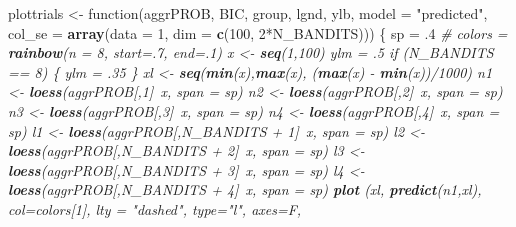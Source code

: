 \documentclass[11pt,,]{article}
\newenvironment{Shaded}{\begin{snugshade}}{\end{snugshade}}
\newcommand{\KeywordTok}[1]{\textcolor[rgb]{0.13,0.29,0.53}{\textbf{{#1}}}}
\newcommand{\DataTypeTok}[1]{\textcolor[rgb]{0.13,0.29,0.53}{{#1}}}
\newcommand{\DecValTok}[1]{\textcolor[rgb]{0.00,0.00,0.81}{{#1}}}
\newcommand{\StringTok}[1]{\textcolor[rgb]{0.31,0.60,0.02}{{#1}}}
\newcommand{\CommentTok}[1]{\textcolor[rgb]{0.56,0.35,0.01}{\textit{{#1}}}}
\newcommand{\NormalTok}[1]{{#1}}
\begin{document}
\begin{Shaded}
\begin{Highlighting}[]
{\NormalTok{plottrials <-}\StringTok{ }\NormalTok{function(aggrPROB, BIC, group, lgnd, ylb, }\DataTypeTok{model =} \StringTok{"predicted"}\NormalTok{, }
                       \DataTypeTok{col_se =} \KeywordTok{array}\NormalTok{(}\DataTypeTok{data =} \DecValTok{1}\NormalTok{, }\DataTypeTok{dim =} \KeywordTok{c}\NormalTok{(}\DecValTok{100}\NormalTok{, }\DecValTok{2}\NormalTok{*N_BANDITS))) \{}
    \NormalTok{sp =}\StringTok{ }\NormalTok{.}\DecValTok{4} \CommentTok{# % of the points}
    \NormalTok{colors =}\StringTok{ }\KeywordTok{rainbow}\NormalTok{(}\DataTypeTok{n =} \DecValTok{8}\NormalTok{, }\DataTypeTok{start=}\NormalTok{.}\DecValTok{7}\NormalTok{, }\DataTypeTok{end=}\NormalTok{.}\DecValTok{1}\NormalTok{)}
    \NormalTok{x <-}\StringTok{ }\KeywordTok{seq}\NormalTok{(}\DecValTok{1}\NormalTok{,}\DecValTok{100}\NormalTok{)}
    \NormalTok{ylm =}\StringTok{ }\NormalTok{.}\DecValTok{5}
    \NormalTok{if (N_BANDITS ==}\StringTok{ }\DecValTok{8}\NormalTok{) \{}
        \NormalTok{ylm =}\StringTok{ }\NormalTok{.}\DecValTok{35}
    \NormalTok{\}}
    \NormalTok{xl <-}\StringTok{ }\KeywordTok{seq}\NormalTok{(}\KeywordTok{min}\NormalTok{(x),}\KeywordTok{max}\NormalTok{(x), (}\KeywordTok{max}\NormalTok{(x) -}\StringTok{ }\KeywordTok{min}\NormalTok{(x))/}\DecValTok{1000}\NormalTok{)}
    \NormalTok{n1 <-}\StringTok{ }\KeywordTok{loess}\NormalTok{(aggrPROB[,}\DecValTok{1}\NormalTok{]~x, }\DataTypeTok{span =} \NormalTok{sp)}
    \NormalTok{n2 <-}\StringTok{ }\KeywordTok{loess}\NormalTok{(aggrPROB[,}\DecValTok{2}\NormalTok{]~x, }\DataTypeTok{span =} \NormalTok{sp)}
    \NormalTok{n3 <-}\StringTok{ }\KeywordTok{loess}\NormalTok{(aggrPROB[,}\DecValTok{3}\NormalTok{]~x, }\DataTypeTok{span =} \NormalTok{sp)}
    \NormalTok{n4 <-}\StringTok{ }\KeywordTok{loess}\NormalTok{(aggrPROB[,}\DecValTok{4}\NormalTok{]~x, }\DataTypeTok{span =} \NormalTok{sp)}
    \NormalTok{l1 <-}\StringTok{ }\KeywordTok{loess}\NormalTok{(aggrPROB[,N_BANDITS +}\StringTok{ }\DecValTok{1}\NormalTok{]~x, }\DataTypeTok{span =} \NormalTok{sp)}
    \NormalTok{l2 <-}\StringTok{ }\KeywordTok{loess}\NormalTok{(aggrPROB[,N_BANDITS +}\StringTok{ }\DecValTok{2}\NormalTok{]~x, }\DataTypeTok{span =} \NormalTok{sp)}
    \NormalTok{l3 <-}\StringTok{ }\KeywordTok{loess}\NormalTok{(aggrPROB[,N_BANDITS +}\StringTok{ }\DecValTok{3}\NormalTok{]~x, }\DataTypeTok{span =} \NormalTok{sp)}
    \NormalTok{l4 <-}\StringTok{ }\KeywordTok{loess}\NormalTok{(aggrPROB[,N_BANDITS +}\StringTok{ }\DecValTok{4}\NormalTok{]~x, }\DataTypeTok{span =} \NormalTok{sp)}
    \KeywordTok{plot} \NormalTok{(xl, }\KeywordTok{predict}\NormalTok{(n1,xl), }\DataTypeTok{col=}\NormalTok{colors[}\DecValTok{1}\NormalTok{], }\DataTypeTok{lty =} \StringTok{"dashed"}\NormalTok{, }\DataTypeTok{type=}\StringTok{"l"}\NormalTok{, }\DataTypeTok{axes=}\NormalTok{F,  }
}}
\end{Highlighting}
\end{Shaded}
\end{document}
